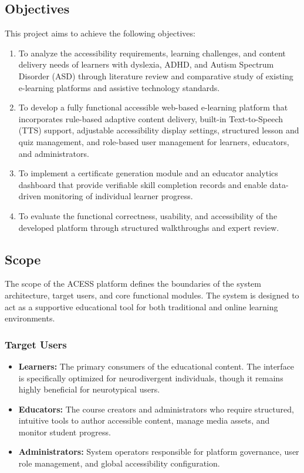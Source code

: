\documentclass[12pt, oneside]{article} %
\begin{document}
\subsection{Objectives}

This project aims to achieve the following objectives:
\begin{enumerate}
    \item To analyze the accessibility requirements, learning challenges, and content delivery needs of learners with dyslexia, ADHD, and Autism Spectrum Disorder (ASD) through literature review and comparative study of existing e-learning platforms and assistive technology standards.
    \item To develop a fully functional accessible web-based e-learning platform that incorporates rule-based adaptive content delivery, built-in Text-to-Speech (TTS) support, adjustable accessibility display settings, structured lesson and quiz management, and role-based user management for learners, educators, and administrators.
    \item To implement a certificate generation module and an educator analytics dashboard that provide verifiable skill completion records and enable data-driven monitoring of individual learner progress.
    \item To evaluate the functional correctness, usability, and accessibility of the developed platform through structured walkthroughs and expert review.
\end{enumerate}

\subsection{Scope}

The scope of the ACESS platform defines the boundaries of the system architecture, target users, and core functional modules. The system is designed to act as a supportive educational tool for both traditional and online learning environments.

\subsubsection{Target Users}
\begin{itemize}
    \item \textbf{Learners:} The primary consumers of the educational content. The interface is specifically optimized for neurodivergent individuals, though it remains highly beneficial for neurotypical users.
    \item \textbf{Educators:} The course creators and administrators who require structured, intuitive tools to author accessible content, manage media assets, and monitor student progress.
    \item \textbf{Administrators:} System operators responsible for platform governance, user role management, and global accessibility configuration.
\end{itemize}
\end{document}
